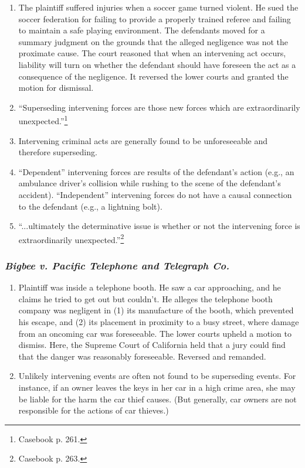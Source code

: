 \begin{enumerate}
    \item The plaintiff suffered injuries when a soccer game turned violent. He sued the soccer federation for failing to provide a properly trained referee and failing to maintain a safe playing environment. The defendants moved for a summary judgment on the grounds that the alleged negligence was not the proximate cause. The court reasoned that when an intervening act occurs, liability will turn on whether the defendant should have foreseen the act as a consequence of the negligence. It reversed the lower courts and granted the motion for dismissal.
    \item ``Superseding intervening forces are those new forces which are extraordinarily unexpected.''\footnote{Casebook p. 261.}
    \item Intervening criminal acts are generally found to be unforeseeable and therefore superseding.
    \item ``Dependent'' intervening forces are results of the defendant's action (e.g., an ambulance driver's collision while rushing to the scene of the defendant's accident). ``Independent'' intervening forces do not have a causal connection to the defendant (e.g., a lightning bolt).
    \item ``...ultimately the determinative issue is whether or not the intervening force is extraordinarily unexpected.''\footnote{Casebook p. 263.}
\end{enumerate}

\subsubsection{\emph{Bigbee v. Pacific Telephone and Telegraph Co.}}

\begin{enumerate}
    \item Plaintiff was inside a telephone booth. He saw a car approaching, and he claims he tried to get out but couldn't. He alleges the telephone booth company was negligent in (1) its manufacture of the booth, which prevented his escape, and (2) its placement in proximity to a busy street, where damage from an oncoming car was foreseeable. The lower courts upheld a motion to dismiss. Here, the Supreme Court of California held that a jury could find that the danger was reasonably foreseeable. Reversed and remanded.
    \item Unlikely intervening events are often not found to be superseding events. For instance, if an owner leaves the keys in her car in a high crime area, she may be liable for the harm the car thief causes. (But generally, car owners are not responsible for the actions of car thieves.)
\end{enumerate}

